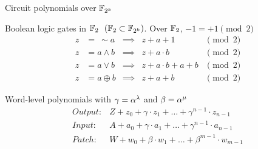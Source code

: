 \begin{frame}{\large Circuit polynomials over ${\mathbb{F}}_{2^k}$}
\bi
	\item Boolean logic gates in ${\mathbb{F}}_2 ~~({\mathbb{F}}_2 \subset {\mathbb{F}}_{2^k})$. Over ${\mathbb{F}}_2$, $-1=+1\pmod{2}$
\ei
	\begin{align*}
		 z &=~ \sim a &\implies &z+a+1 &\pmod{2}\\
		 z &= a \wedge b &\implies &z+a\cdot b &\pmod{2}\\
		 z &= a \vee b &\implies &z+a\cdot b + a + b &\pmod{2}\\
		 z &= a \oplus b &\implies &z+a+b &\pmod{2}
	\end{align*}
\pause
\bi
	\item Word-level polynomials with $\gamma = \alpha^{\lambda}$ and $\beta = \alpha^{\mu}$
\ei
\begin{equation*}
\begin{split}
 Output:& Z + z_0 +\gamma \cdot  z_1 + \dots +\gamma^{n-1} \cdot z_{n-1}\\
 Input: & A + a_0 +\gamma \cdot a_1 + \dots +\gamma^{n-1} \cdot a_{n-1} \\
 Patch: & W + w_0 +\beta \cdot w_1 + \dots +\beta^{m-1} \cdot w_{m-1}
\end{split}
\end{equation*}
\end{frame}


